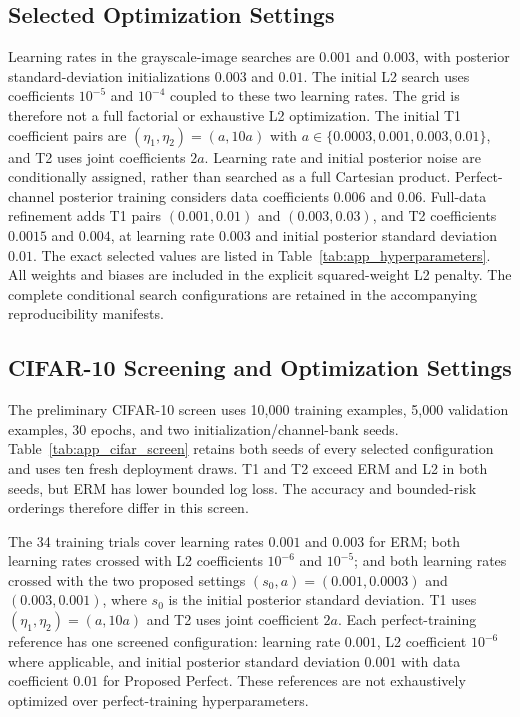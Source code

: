 \subsection{Selected Optimization Settings}
Learning rates in the grayscale-image searches are $0.001$ and $0.003$, with
posterior standard-deviation initializations $0.003$ and $0.01$. The
initial L2 search uses coefficients $10^{-5}$ and $10^{-4}$ coupled to
these two learning rates. The grid is therefore not a full factorial or
exhaustive L2 optimization. The initial T1 coefficient pairs are
$(\eta_1,\eta_2)=(a,10a)$ with
$a\in\{0.0003,0.001,0.003,0.01\}$, and T2 uses joint coefficients $2a$.
Learning rate and initial posterior noise are conditionally assigned,
rather than searched as a full Cartesian product. Perfect-channel
posterior training considers data coefficients $0.006$ and $0.06$.
Full-data refinement adds T1 pairs $(0.001,0.01)$ and $(0.003,0.03)$,
and T2 coefficients $0.0015$ and $0.004$, at learning rate $0.003$ and
initial posterior standard deviation $0.01$. The exact selected values
are listed in Table~\ref{tab:app_hyperparameters}. All weights and biases are
included in the explicit squared-weight L2 penalty. The complete
conditional search configurations are retained in the accompanying
reproducibility manifests.


\subsection{CIFAR-10 Screening and Optimization Settings}
The preliminary CIFAR-10 screen uses 10,000 training examples, 5,000
validation examples, 30 epochs, and two initialization/channel-bank seeds.
Table~\ref{tab:app_cifar_screen} retains both seeds of every selected
configuration and uses ten fresh deployment draws. T1 and T2 exceed ERM
and L2 in both seeds, but ERM has lower bounded log loss. The accuracy and
bounded-risk orderings therefore differ in this screen.


The 34 training trials cover learning rates $0.001$ and $0.003$ for ERM;
both learning rates crossed with L2 coefficients $10^{-6}$ and $10^{-5}$;
and both learning rates crossed with the two proposed settings
$(s_0,a)=(0.001,0.0003)$ and $(0.003,0.001)$, where $s_0$ is the initial
posterior standard deviation. T1 uses $(\eta_1,\eta_2)=(a,10a)$ and T2
uses joint coefficient $2a$. Each perfect-training reference has one
screened configuration: learning rate $0.001$, L2 coefficient $10^{-6}$
where applicable, and initial posterior standard deviation $0.001$ with
data coefficient $0.01$ for Proposed Perfect. These references are not
exhaustively optimized over perfect-training hyperparameters.

